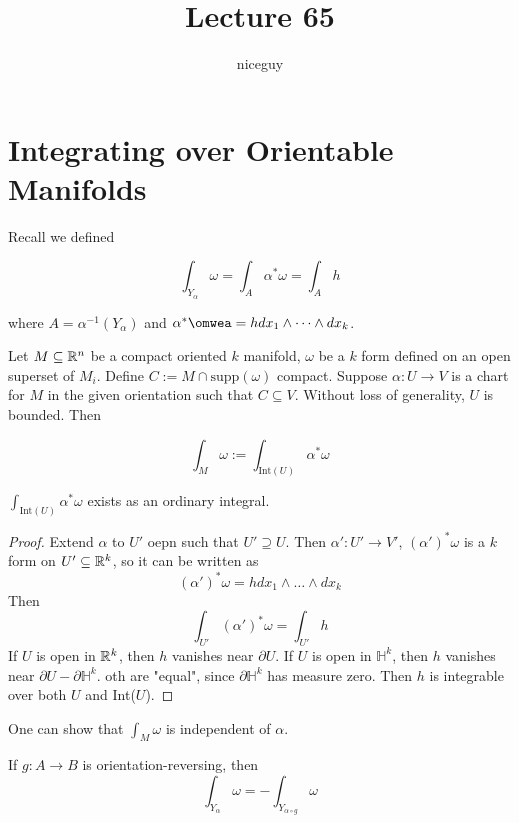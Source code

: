 \documentclass[12pt]{article}
\title{Lecture 65}
\author{niceguy}
\begin{document}
\maketitle

\section{Integrating over Orientable Manifolds}

Recall we defined

$$\int_{Y_\alpha}\omega = \int_A \alpha^*\omega = \int_A h$$

where $A = \alpha^{-1}(Y_\alpha)$ and $\alpha^*\omwea = hdx_1 \wedge \dots \wedge dx_k$.

\begin{defn}
    Let $M \subseteq \mathbb{R}^n$ be a compact oriented $k$ manifold, $\omega$ be a $k$ form defined on an open superset of $M_i$. Define $C := M \cap \text{supp}(\omega)$ compact. Suppose $\alpha: U \rightarrow V$ is a chart for $M$ in the given orientation such that $C \subseteq V$. Without loss of generality, $U$ is bounded. Then

    $$\int_M\omega := \int_{\text{Int}(U)} \alpha^*\omega$$
\end{defn}

\begin{lem}
    $\int_{\text{Int}(U)} \alpha^*\omega$ exists as an ordinary integral.
\end{lem}

\begin{proof}
    Extend $\alpha$ to $U'$ oepn such that $U' \supseteq U$. Then $\alpha': U' \rightarrow V'$, $(\alpha')^*\omega$ is a $k$ form on $U' \subseteq \mathbb{R}^k$, so it can be written as
    $$(\alpha')^*\omega = hdx_1 \wedge \dots \wedge dx_k$$
    Then
    $$\int_{U'}(\alpha')^*\omega = \int_{U'} h$$
    If $U$ is open in $\mathbb{R}^k$, then $h$ vanishes near $\partial U$. If $U$ is open in $\mathbb H^k$, then $h$ vanishes near $\partial U - \partial \mathbb H^k$. oth are "equal", since $\partial \mathbb H^k$ has measure zero. Then $h$ is integrable over both $U$ and Int($U$).
\end{proof}

One can show that $\int_M\omega$ is independent of $\alpha$.

\begin{thm}
    If $g:A\rightarrow B$ is orientation-reversing, then
    $$\int_{Y_\alpha}\omega = -\int_{Y_{\alpha\circ g}} \omega$$
\end{thm}
\end{document}
